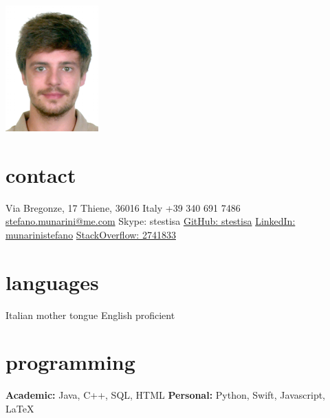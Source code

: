 \documentclass[]{friggeri-cv} %
\begin{document}


\begin{aside} %
\includegraphics[scale=0.5]{fototessera}
\section{contact}
Via Bregonze, 17
Thiene, 36016
Italy
+39 340 691 7486
\href{mailto:stefano.munarini@me.com}{stefano.munarini@me.com}
Skype: stestisa
\href{https://github.com/stestisa}{GitHub: stestisa}
\href{https://it.linkedin.com/in/munarinistefano}{LinkedIn: munarinistefano}
\href{http://stackexchange.com/users/2741833/stefano-munarini}{StackOverflow: 2741833}
\section{languages}
Italian mother tongue
English proficient
\section{programming}
\textbf{Academic:} Java, C++,
SQL, HTML
\textbf{Personal:} Python, Swift,
Javascript, LaTeX
\end{aside}

\end{document}
